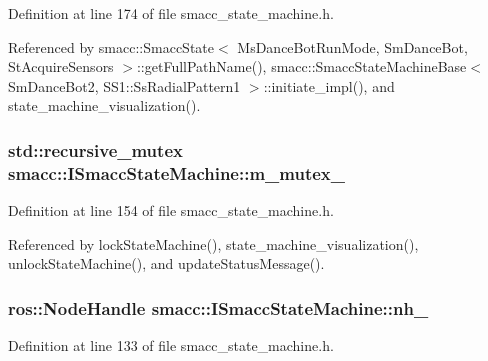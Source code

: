 Definition at line 174 of file smacc\+\_\+state\+\_\+machine.\+h.



Referenced by smacc\+::\+Smacc\+State$<$ Ms\+Dance\+Bot\+Run\+Mode, Sm\+Dance\+Bot, St\+Acquire\+Sensors $>$\+::get\+Full\+Path\+Name(), smacc\+::\+Smacc\+State\+Machine\+Base$<$ Sm\+Dance\+Bot2, S\+S1\+::\+Ss\+Radial\+Pattern1 $>$\+::initiate\+\_\+impl(), and state\+\_\+machine\+\_\+visualization().

\subsubsection[{\texorpdfstring{m\+\_\+mutex\+\_\+}{m_mutex_}}]{\setlength{\rightskip}{0pt plus 5cm}std\+::recursive\+\_\+mutex smacc\+::\+I\+Smacc\+State\+Machine\+::m\+\_\+mutex\+\_\+\hspace{0.3cm}{\ttfamily [private]}}\hypertarget{classsmacc_1_1ISmaccStateMachine_aac785541646e5c517273bf31072505a1}{}\label{classsmacc_1_1ISmaccStateMachine_aac785541646e5c517273bf31072505a1}


Definition at line 154 of file smacc\+\_\+state\+\_\+machine.\+h.



Referenced by lock\+State\+Machine(), state\+\_\+machine\+\_\+visualization(), unlock\+State\+Machine(), and update\+Status\+Message().

\subsubsection[{\texorpdfstring{nh\+\_\+}{nh_}}]{\setlength{\rightskip}{0pt plus 5cm}ros\+::\+Node\+Handle smacc\+::\+I\+Smacc\+State\+Machine\+::nh\+\_\+\hspace{0.3cm}{\ttfamily [protected]}}\hypertarget{classsmacc_1_1ISmaccStateMachine_ad8877bcca9dbb345fe72cca839c93dd3}{}\label{classsmacc_1_1ISmaccStateMachine_ad8877bcca9dbb345fe72cca839c93dd3}


Definition at line 133 of file smacc\+\_\+state\+\_\+machine.\+h.



